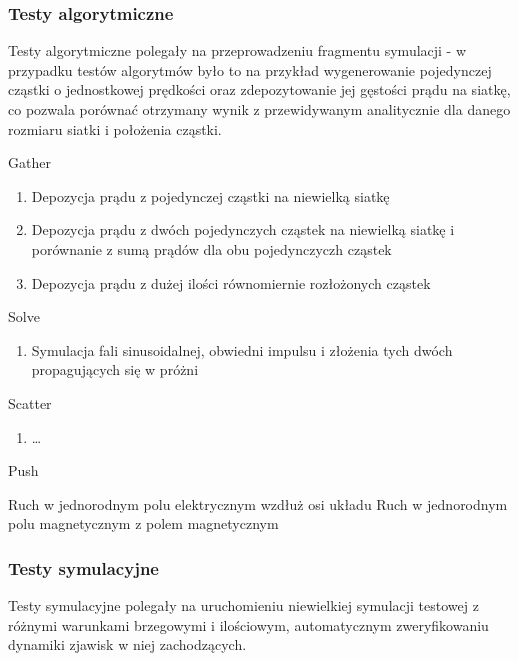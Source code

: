     \subsubsection{Testy algorytmiczne}
    Testy algorytmiczne polegały na przeprowadzeniu fragmentu symulacji - w
    przypadku testów algorytmów było to na przykład wygenerowanie pojedynczej
    cząstki o jednostkowej prędkości oraz zdepozytowanie jej gęstości prądu na
    siatkę, co pozwala porównać otrzymany wynik z przewidywanym analitycznie
    dla danego rozmiaru siatki i położenia cząstki.
    \begin{enumerate}
        \itemi Gather
            \begin{enumerate}
                \item Depozycja prądu z pojedynczej cząstki na niewielką siatkę
                \item Depozycja prądu z dwóch pojedynczych cząstek na niewielką
                    siatkę i porównanie z sumą prądów dla obu pojedynczyczh
                    cząstek
                \item Depozycja prądu z dużej ilości równomiernie rozłożonych
                    cząstek
            \end{enumerate}

        \itemi Solve
            \begin{enumerate}
                \item Symulacja fali sinusoidalnej, obwiedni impulsu i złożenia
                    tych dwóch propagujących się w próżni
            \end{enumerate}

        \itemi Scatter
            \begin{enumerate}
                \item \ldots {}
            \end{enumerate}

        \itemi Push
            \begin{enumerate}
                \itemii Ruch w jednorodnym polu elektrycznym wzdłuż osi układu
                \itemii Ruch w jednorodnym polu magnetycznym z polem
                    magnetycznym
            \end{enumerate}
    \end{enumerate}

    \subsubsection{Testy symulacyjne}
    Testy symulacyjne polegały na uruchomieniu niewielkiej symulacji testowej z
    różnymi warunkami brzegowymi i ilościowym, automatycznym zweryfikowaniu
    dynamiki zjawisk w niej zachodzących.

